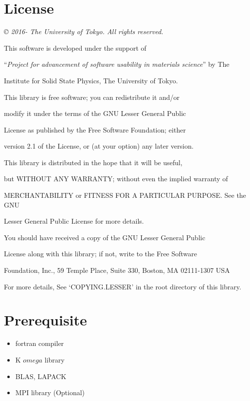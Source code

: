 \documentclass[letterpaper,10pt,dvipdfmx,openany]{sphinxmanual}
\begin{document}
\chapter{License}
\label{shiftk_copy_en::doc}\label{shiftk_copy_en:license}
\emph{© 2016- The University of Tokyo. All rights reserved.}

\begin{DUlineblock}{0em}
\item[] This software is developed under the support of
\item[] ``\emph{Project for advancement of software usability in materials science}'' by The
\item[] Institute for Solid State Physics, The University of Tokyo.
\item[] 
\item[] This library is free software; you can redistribute it and/or
\item[] modify it under the terms of the GNU Lesser General Public
\item[] License as published by the Free Software Foundation; either
\item[] version 2.1 of the License, or (at your option) any later version.
\item[] This library is distributed in the hope that it will be useful,
\item[] but WITHOUT ANY WARRANTY; without even the implied warranty of
\item[] MERCHANTABILITY or FITNESS FOR A PARTICULAR PURPOSE. See the GNU
\item[] Lesser General Public License for more details.
\item[] 
\item[] You should have received a copy of the GNU Lesser General Public
\item[] License along with this library; if not, write to the Free Software
\item[] Foundation, Inc., 59 Temple Place, Suite 330, Boston, MA 02111-1307 USA
\item[] 
\item[] For more details, See ‘COPYING.LESSER’ in the root directory of this library.
\end{DUlineblock}


\chapter{Prerequisite}
\label{shiftk_env_en::doc}\label{shiftk_env_en:prerequisite}\begin{itemize}
\item {} 
fortran compiler

\item {} 
K \(omega\) library

\item {} 
BLAS, LAPACK

\item {} 
MPI library (Optional)

\end{itemize}
\end{document}
